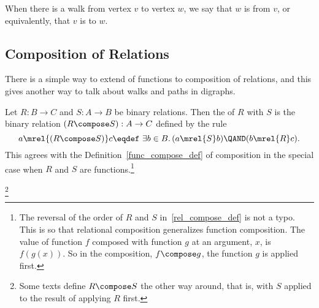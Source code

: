 \begin{definition}
When there is a walk from vertex $v$ to vertex $w$, we say that $w$ is
 from $v$, or equivalently, that $v$ is
 to $w$.
\end{definition}

\subsection{Composition of Relations}\label{relation_compose_subsec}
There is a simple way to extend  of functions to
composition of relations, and this gives another way to talk about
walks and paths in digraphs.

\begin{definition}
Let $R: B\to C$ and $S: A \to B$ be binary relations.  Then the
 of $R$ with $S$ is the binary relation $(R \compose
S): A\to C$ defined by the rule
\begin{equation}\label{rel_compose_def}
a \mrel{(R \compose S)} c \eqdef\ \exists b \in B.\, (a \mrel{S} b)
\QAND (b \mrel{R} c).
\end{equation}
This agrees with the Definition~\ref{func_compose_def} of composition
in the special case when $R$ and $S$ are functions.\footnote{The
  reversal of the order of $R$ and $S$ in~\eqref{rel_compose_def} is
  not a typo.  This is so that relational composition generalizes
  function composition.  The value of function $f$ composed with
  function $g$ at an argument, $x$, is $f(g(x))$.  So in the
  composition, $f \compose g$, the function $g$ is applied first.}
\end{definition}

\begin{editingnotes}

\footnote{Some texts define $R \compose S$ the other way around, that
  is, with $S$ applied to the result of applying $R$ first.}

\end{editingnotes}

